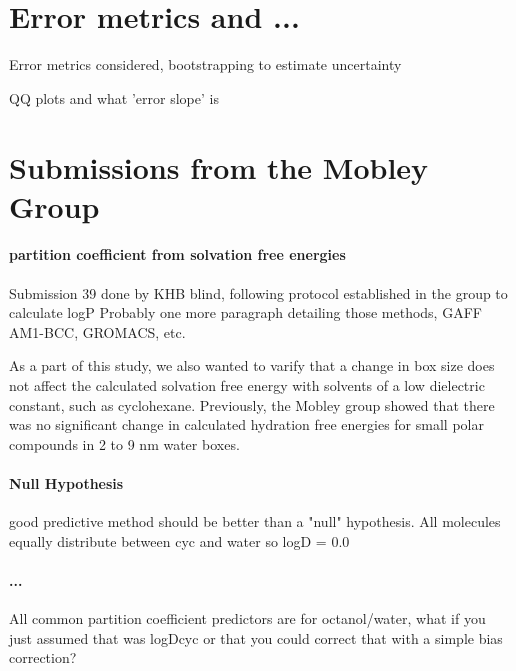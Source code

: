 \section{Error metrics and ...}
\label{analysis}
Error metrics considered, bootstrapping to estimate uncertainty

QQ plots and what 'error slope' is


\section{Submissions from the Mobley Group}
\label{methods:1}
\paragraph{partition coefficient from solvation free energies}
Submission 39 done by KHB blind, following protocol established in the group to calculate logP %
Probably one more paragraph detailing those methods, GAFF AM1-BCC, GROMACS, etc.

As a part of this study, we also wanted to varify that a change in box size does not affect the calculated solvation free energy with solvents of a low dielectric constant, such as cyclohexane. 
Previously, the Mobley group showed that there was no significant change in calculated hydration free energies for small polar compounds in 2 to 9 nm water boxes.  

\paragraph{Null Hypothesis}

good predictive method should be better than a "null" hypothesis. All molecules equally distribute between cyc and water so logD = 0.0

\paragraph{...} %
All common partition coefficient predictors are for octanol/water, what if you just assumed that was logDcyc or that you could correct that with a simple bias correction?


